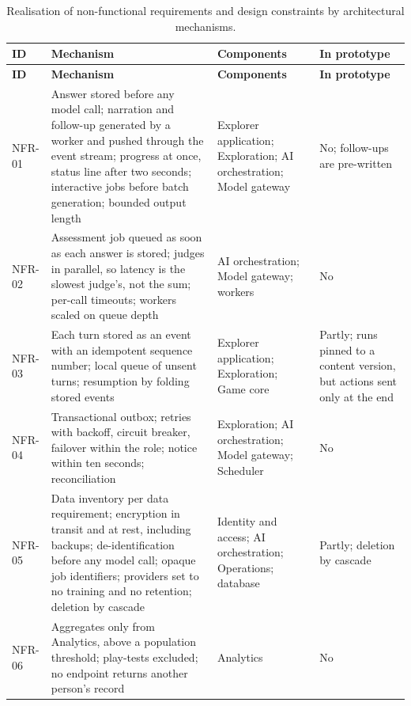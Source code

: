 {\small{}\renewcommand{\arraystretch}{1.1}
\begin{longtable}{|>{\raggedright\arraybackslash}p{}|>{\raggedright\arraybackslash}p{}|>{\raggedright\arraybackslash}p{}|>{\raggedright\arraybackslash}p{}|}
\caption{Realisation of non-\allowbreak{}functional requirements and design constraints by architectural mechanisms.} \\
\hline
\textbf{ID} & \textbf{Mechanism} & \textbf{Components} & \textbf{In prototype} \\ \hline
\endfirsthead
\hline
\textbf{ID} & \textbf{Mechanism} & \textbf{Components} & \textbf{In prototype} \\ \hline
\endhead
NFR-01 & Answer stored before any model call; narration and follow-up generated by a worker and pushed through the event stream; progress at once, status line after two seconds; interactive jobs before batch generation; bounded output length & Explorer application; Exploration; AI orchestration; Model gateway & No; follow-ups are pre-written \\ \hline
NFR-02 & Assessment job queued as soon as each answer is stored; judges in parallel, so latency is the slowest judge's, not the sum; per-call timeouts; workers scaled on queue depth & AI orchestration; Model gateway; workers & No \\ \hline
NFR-03 & Each turn stored as an event with an idempotent sequence number; local queue of unsent turns; resumption by folding stored events & Explorer application; Exploration; Game core & Partly; runs pinned to a content version, but actions sent only at the end \\ \hline
NFR-04 & Transactional outbox; retries with backoff, circuit breaker, failover within the role; notice within ten seconds; reconciliation & Exploration; AI orchestration; Model gateway; Scheduler & No \\ \hline
NFR-05 & Data inventory per data requirement; encryption in transit and at rest, including backups; de-\allowbreak{}identification before any model call; opaque job identifiers; providers set to no training and no retention; deletion by cascade & Identity and access; AI orchestration; Operations; database & Partly; deletion by cascade \\ \hline
NFR-06 & Aggregates only from Analytics, above a population threshold; play-tests excluded; no endpoint returns another person's record & Analytics & No \\ \hline

\end{longtable}}
